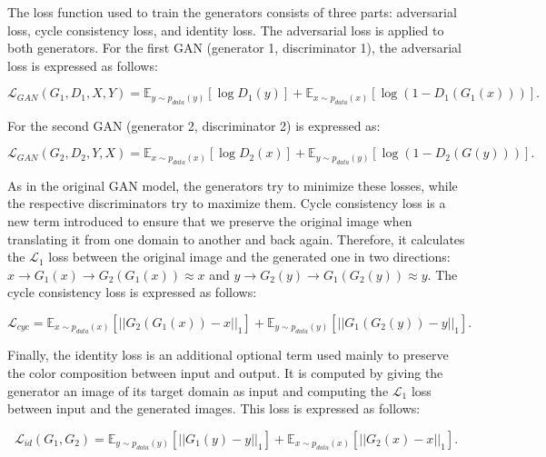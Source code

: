 The loss function used to train the generators consists of three parts: adversarial loss, cycle consistency loss, and identity loss. The adversarial loss  is applied to both generators. For the first \ac{GAN} (generator 1, discriminator 1), the adversarial loss is expressed as follows:

\begin{equation} \mathcal{L}_{ GAN }(G_1,D_1,X,Y)=\mathbb{E}_{y\sim p_{data}(y)}[\log{D_1(y)}]+\mathbb{E}_{x\sim p_{data}(x)}[\log{(1-D_1(G_1(x)))}]. 
\end{equation} 

For the second \ac{GAN} (generator 2, discriminator 2) is expressed as:

\begin{equation} \mathcal{L}_{ GAN }(G_2,D_2,Y,X)=\mathbb{E}_{x\sim p_{data}(x)}[\log{D_2(x)}]+\mathbb{E}_{y\sim p_{data}(y)}[\log{(1-D_2(G(y)))}]. 
\end{equation}
 
As in the original \ac{GAN} model, the generators try to minimize these losses, while the respective discriminators try to maximize them. Cycle consistency loss is a new term introduced to ensure that we preserve the original image when translating it from one domain to another and back again. Therefore, it calculates the $\mathcal{L}_{1}$ loss between the original image and the generated one in two directions: $x \rightarrow G_1(x) \rightarrow G_2(G_1(x)) \approx x$ and $y \rightarrow G_2(y) \rightarrow G_1(G_2(y)) \approx y$. The cycle consistency loss is expressed as follows:

\begin{equation} 
\mathcal{L}_{cyc} = \mathbb{E}_{x\sim p_{data}(x)} [||G_{2}(G_{1}(x))-x||_1] + \mathbb{E}_{y\sim p_{data}(y)} [||G_{1}(G_{2}(y))-y||_1].
\label{eq:CCL}
\end{equation}

Finally, the identity loss is an additional optional term used mainly to preserve the color composition between input and output. It is computed by giving the generator an image of its target domain as input and computing the $\mathcal{L}_{1}$ loss between input and the generated images. This loss is expressed as follows:

\begin{equation} 
\mathcal{L}_{id}(G_1,G_2) = \mathbb{E}_{y\sim p_{data}(y)} [||G_{1}(y)-y||_1] + \mathbb{E}_{x\sim p_{data}(x)} [||G_{2}(x)-x||_1].
\label{eq:identity}
\end{equation}

